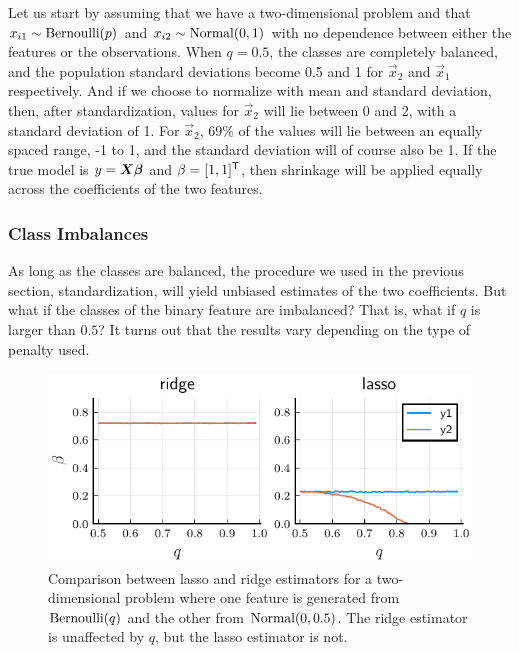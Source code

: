 Let us start by assuming that we have a two-dimensional problem and that \(x_{i1} \sim \operatorname{Bernoulli}(p)\) and \(x_{i2} \sim \operatorname{Normal}(0, 1)\) with no dependence between either the features or the observations. When \(q = 0.5\), the classes are completely balanced, and the population standard deviations become 0.5 and 1 for \(\vec{x}_2\) and \(\vec{x}_1\) respectively. And if we choose to normalize with mean and standard deviation, then, after standardization, values for \(\vec{x}_2\) will lie between 0 and 2, with a standard deviation of 1. For \(\vec{x}_2\), 69\% of the values will lie between an equally spaced range, -1 to 1, and the standard deviation will of course also be 1. If the true model is \(y = \mat{X}\vec{\beta}\) and \(\beta = [1,1]^{\mathsf{T}}\), then shrinkage will be applied equally across the coefficients of the two features.

\subsubsection{Class Imbalances}

As long as the classes are balanced, the procedure we used in the previous section, standardization, will yield unbiased estimates of the two coefficients. But what if the classes of the binary feature are imbalanced? That is, what if \(q\) is larger than \(0.5\)? It turns out that the results vary depending on the type of penalty used.

\begin{figure}[htpb]
  \centering
  \includegraphics[]{plots/lasso_ridge_twodim.pdf}
  \caption{%
    Comparison between lasso and ridge estimators for a two-dimensional problem where one feature is generated from \(\operatorname{Bernoulli}(q)\) and the other from \(\operatorname{Normal}(0, 0.5)\). The ridge estimator is unaffected by \(q\), but the lasso estimator is not.
  }
  \label{fig:lasso-ridge-comparison}
\end{figure}

